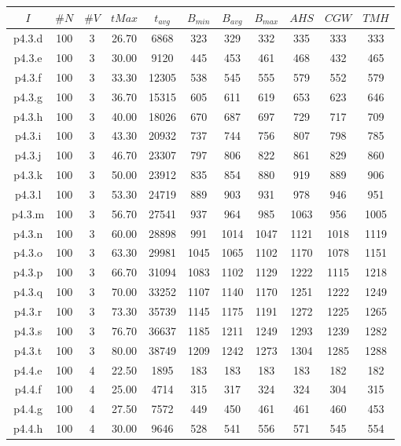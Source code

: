\begin{center}
\begin{tabular}{ |c|c|c|c|c|c|c|c|c|c|c| } 
\hline
$I$ & $\#N$ & $\#V$ & $tMax$ & $t_{avg}$ & $B_{min}$ & $B_{avg}$ & $B_{max}$ & $AHS$ & $CGW$ & $TMH$\\
\hline
p4.3.d & 100 & 3 & 26.70 & 6868 & 323 & 329 & 332 & 335 & 333 & 333  \\
p4.3.e & 100 & 3 & 30.00 & 9120 & 445 & 453 & 461 & 468 & 432 & 465  \\
p4.3.f & 100 & 3 & 33.30 & 12305 & 538 & 545 & 555 & 579 & 552 & 579  \\
p4.3.g & 100 & 3 & 36.70 & 15315 & 605 & 611 & 619 & 653 & 623 & 646  \\
p4.3.h & 100 & 3 & 40.00 & 18026 & 670 & 687 & 697 & 729 & 717 & 709  \\
p4.3.i & 100 & 3 & 43.30 & 20932 & 737 & 744 & 756 & 807 & 798 & 785  \\
p4.3.j & 100 & 3 & 46.70 & 23307 & 797 & 806 & 822 & 861 & 829 & 860  \\
p4.3.k & 100 & 3 & 50.00 & 23912 & 835 & 854 & 880 & 919 & 889 & 906  \\
p4.3.l & 100 & 3 & 53.30 & 24719 & 889 & 903 & 931 & 978 & 946 & 951  \\
p4.3.m & 100 & 3 & 56.70 & 27541 & 937 & 964 & 985 & 1063 & 956 & 1005  \\
p4.3.n & 100 & 3 & 60.00 & 28898 & 991 & 1014 & 1047 & 1121 & 1018 & 1119  \\
p4.3.o & 100 & 3 & 63.30 & 29981 & 1045 & 1065 & 1102 & 1170 & 1078 & 1151  \\
p4.3.p & 100 & 3 & 66.70 & 31094 & 1083 & 1102 & 1129 & 1222 & 1115 & 1218  \\
p4.3.q & 100 & 3 & 70.00 & 33252 & 1107 & 1140 & 1170 & 1251 & 1222 & 1249  \\
p4.3.r & 100 & 3 & 73.30 & 35739 & 1145 & 1175 & 1191 & 1272 & 1225 & 1265  \\
p4.3.s & 100 & 3 & 76.70 & 36637 & 1185 & 1211 & 1249 & 1293 & 1239 & 1282  \\
p4.3.t & 100 & 3 & 80.00 & 38749 & 1209 & 1242 & 1273 & 1304 & 1285 & 1288  \\
p4.4.e & 100 & 4 & 22.50 & 1895 & 183 & 183 & 183 & 183 & 182 & 182  \\
p4.4.f & 100 & 4 & 25.00 & 4714 & 315 & 317 & 324 & 324 & 304 & 315  \\
p4.4.g & 100 & 4 & 27.50 & 7572 & 449 & 450 & 461 & 461 & 460 & 453  \\
p4.4.h & 100 & 4 & 30.00 & 9646 & 528 & 541 & 556 & 571 & 545 & 554  \\

\end{tabular}
\end{center}
